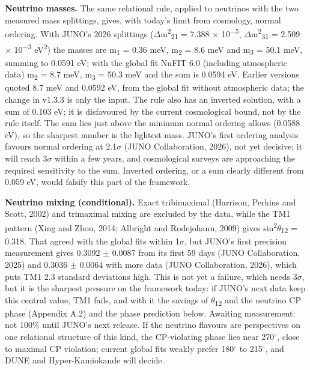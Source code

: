 \documentclass[
  11pt,
]{article}
\begin{document}
\textbf{Neutrino masses.} The same relational rule, applied to neutrinos with the two measured mass splittings, gives, with today's limit from cosmology, normal ordering. With JUNO's 2026 splittings (\ensuremath{\Delta}m\textsuperscript{2}\textsubscript{21} = 7.388 \ensuremath{\times} 10\textsuperscript{\ensuremath{-}5}, \ensuremath{\Delta}m\textsuperscript{2}\textsubscript{31} = 2.509 \ensuremath{\times} 10\textsuperscript{\ensuremath{-}3} eV\textsuperscript{2}) the masses are m\textsubscript{1} = 0.36 meV, m\textsubscript{2} = 8.6 meV and m\textsubscript{3} = 50.1 meV, summing to 0.0591 eV; with the global fit NuFIT 6.0 (including atmospheric data) m\textsubscript{2} = 8.7 meV, m\textsubscript{3} = 50.3 meV and the sum is 0.0594 eV. Earlier versions quoted 8.7 meV and 0.0592 eV, from the global fit without atmospheric data; the change in v1.3.3 is only the input. The rule also has an inverted solution, with a sum of 0.103 eV; it is disfavoured by the current cosmological bound, not by the rule itself. The sum lies just above the minimum normal ordering allows (0.0588 eV), so the sharpest number is the lightest mass. JUNO's first ordering analysis favours normal ordering at 2.1\ensuremath{\sigma} (JUNO Collaboration, 2026), not yet decisive; it will reach 3\ensuremath{\sigma} within a few years, and cosmological surveys are approaching the required sensitivity to the sum. Inverted ordering, or a sum clearly different from 0.059 eV, would falsify this part of the framework.

\textbf{Neutrino mixing (conditional).} Exact tribimaximal (Harrison, Perkins and Scott, 2002) and trimaximal mixing are excluded by the data, while the TM1 pattern (Xing and Zhou, 2014; Albright and Rodejohann, 2009) gives sin\textsuperscript{2}\ensuremath{\theta}\textsubscript{12} = 0.318. That agreed with the global fits within 1\ensuremath{\sigma}, but JUNO's first precision measurement gives 0.3092 \ensuremath{\pm} 0.0087 from its first 59 days (JUNO Collaboration, 2025) and 0.3036 \ensuremath{\pm} 0.0064 with more data (JUNO Collaboration, 2026), which puts TM1 2.3 standard deviations high. This is not yet a failure, which needs 3\ensuremath{\sigma}, but it is the sharpest pressure on the framework today: if JUNO's next data keep this central value, TM1 fails, and with it the savings of \ensuremath{\theta}\textsubscript{12} and the neutrino CP phase (Appendix A.2) and the phase prediction below. Awaiting measurement: not 100\% until JUNO's next release. If the neutrino flavours are perspectives on one relational structure of this kind, the CP-violating phase lies near 270\ensuremath{^\circ}, close to maximal CP violation; current global fits weakly prefer 180\ensuremath{^\circ} to 215\ensuremath{^\circ}, and DUNE and Hyper-Kamiokande will decide.
\end{document}
